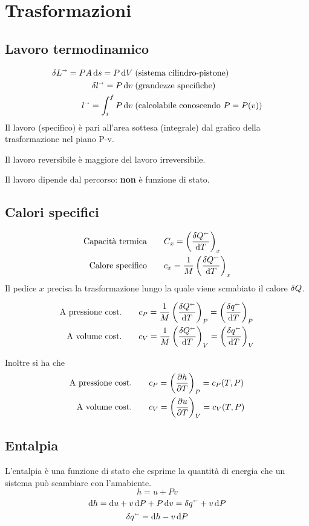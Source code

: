 \section{Trasformazioni}

\subsection{Lavoro termodinamico}

\begin{align*}
    \delta L^\shortrightarrow = PA\dd{s} = P\dd{V} \;& \text{(sistema cilindro-pistone)}\\
    \delta l^\shortrightarrow = P\dd{v} \;& (\text{grandezze specifiche})\\
    l^\shortrightarrow = \int_i^f P\dd{v} \;& (\text{calcolabile conoscendo $P = P(v)$})
\end{align*}
Il lavoro (specifico) è pari all'area sottesa (integrale) dal grafico della trasformazione nel piano P-v.

Il lavoro reversibile è maggiore del lavoro irreversibile.

Il lavoro dipende dal percorso: \textbf{non} è funzione di stato.

\subsection{Calori specifici}

\begin{align*}
    \text{Capacità termica} &\qquad C_x = \left(\frac{\delta Q^\shortleftarrow}{\dd{T}}\right)_x \\
    \text{Calore specifico} &\qquad c_x = \frac{1}{M} \left(\frac{\delta Q^\shortleftarrow}{\dd{T}}\right)_x
\end{align*}
Il pedice $x$ precisa la trasformazione lungo la quale viene scmabiato il calore $\var{Q}$.

\begin{align*}
    \text{A pressione cost.} &\qquad c_P = \frac{1}{M} \left(\frac{\delta Q^\shortleftarrow}{\dd{T}}\right)_P = \left(\frac{\delta q^\shortleftarrow}{\dd{T}}\right)_P \\
    \text{A volume cost.} &\qquad c_V = \frac{1}{M} \left(\frac{\delta Q^\shortleftarrow}{\dd{T}}\right)_V = \left(\frac{\delta q^\shortleftarrow}{\dd{T}}\right)_V
\end{align*}

Inoltre si ha che
\begin{align*}
    \text{A pressione cost.} &\qquad c_P = \qty(\pdv{h}{T})_P = c_P(T,P)\\
    \text{A volume cost.} &\qquad c_V = \qty(\pdv{u}{T})_V = c_V(T,P)
\end{align*}

\subsection{Entalpia}

L'entalpia è una funzione di stato che esprime la quantità di energia che un sistema può scambiare con l'amabiente.
\[ h = u + Pv \]
\[ \dd{h} = \dd{u} + v\dd{P} + P\dd{v} = \delta q^\shortleftarrow + v\dd{P} \]
\[ \delta q^\shortleftarrow = \dd{h} - v\dd{P} \]
